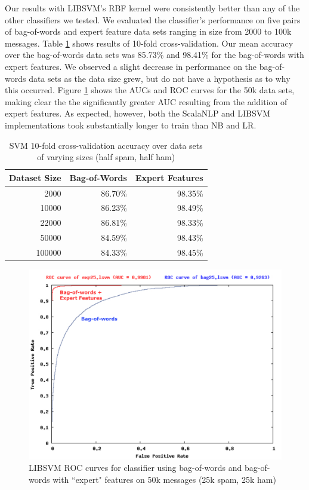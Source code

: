 \documentclass[preprint]{acm_proc_article-sp}
\begin{document}
Our results with LIBSVM's RBF kernel were consistently better than any of the other classifiers we tested. We 
evaluated the classifier's performance on five pairs of bag-of-words and expert feature data sets ranging in 
size from 2000 to 100k messages. Table \ref{tab:svmacc} shows results of 10-fold cross-validation. Our mean 
accuracy over the bag-of-words data sets was 85.73\% and 98.41\% for the bag-of-words with expert features. We 
observed a slight decrease in performance on the bag-of-words data sets as the data size grew, but do not 
have a hypothesis as to why this occurred. Figure \ref{fig:roc-25}
shows the AUCs and ROC curves for the 50k data sets, making clear the the significantly greater AUC resulting 
from the addition of expert features. As expected, however, both the ScalaNLP and LIBSVM implementations 
took substantially longer to train than NB and LR.

\begin{table}
\small
\begin{tabular}{r|r|r}
\hline
\textbf{Dataset Size} & \textbf{Bag-of-Words} & \textbf{Expert Features} \\
\hline
2000 & 86.70\% & 98.35\% \\
10000 & 86.23\% & 98.49\% \\
22000 & 86.81\% & 98.33\% \\
50000 & 84.59\% & 98.43\% \\
100000 & 84.33\% & 98.45\% \\
\end{tabular}
\caption{SVM 10-fold cross-validation accuracy over data sets of varying sizes (half spam, half ham)} 
\label{tab:svmacc}
\end{table}

\begin{figure}[h]
    \centering
    \includegraphics[width=\linewidth]{figures/roc-25.pdf}
    \caption{LIBSVM ROC curves for classifier using bag-of-words and bag-of-words with ``expert" features on 50k messages 
     (25k spam, 25k ham)}
    \label{fig:roc-25}
\end{figure}
\end{document}
